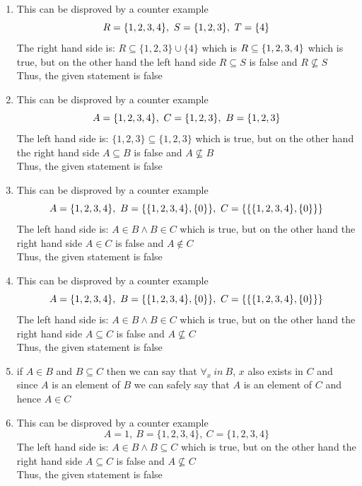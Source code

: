 \documentclass[12pt]{article}
\newenvironment{solution}[2][Solution]{ \begin{trivlist}
\item[\hskip \labelsep {\bfseries #1}]}{\end{trivlist}}
\begin{document}
\begin{solution}{1}
\item[] 
\begin{enumerate}[label=\alph*)]
\item This can be disproved by a counter example $$R = \{1,2,3,4\},\ S = \{1,2,3\},\ T = \{4\} \\$$
The right hand side is:
$R \subseteq \{1,2,3\} \cup \{4\}$ which is $R \subseteq \{1,2,3,4\} \\$ which is true, but on the other hand the left hand side $R \subseteq S$ is false and $R \nsubseteq S$ \\
Thus, the given statement is false

\item This can be disproved by a counter example $$A = \{1,2,3,4\},\ C = \{1,2,3\},\ B = \{1,2,3\} \\$$
The left hand side is:
$\{1,2,3\} \subseteq \{1,2,3\}$ which is true, but on the other hand the right hand side $A \subseteq B$ is false and $A \nsubseteq B$ \\
Thus, the given statement is false

\item This can be disproved by a counter example $$A = \{1,2,3,4\},\ B = \{\{1,2,3,4\},\{0\}\},\ C = \{\{\{1,2,3,4\},\{0\}\}\} \\$$
The left hand side is:
$A \in B \wedge B \in C$ which is true, but on the other hand the right hand side $A \in C$ is false and $A \notin C$ \\
Thus, the given statement is false

\item This can be disproved by a counter example $$A = \{1,2,3,4\},\ B = \{\{1,2,3,4\},\{0\}\},\ C = \{\{\{1,2,3,4\},\{0\}\}\} \\$$
The left hand side is:
$A \in B \wedge B \in C$ which is true, but on the other hand the right hand side $A \subseteq C$ is false and $A \nsubseteq C$ \\
Thus, the given statement is false

\item if $A \in B$ and $B \subseteq C$ then we can say that $\forall_x\ in\ B$, $x$ also exists in $C$ and since $A$ is an element of $B$ we can safely say that $A$ is an element of $C$ and hence $A \in C$

\item This can be disproved by a counter example $$A = 1,\ B = \{1,2,3,4\},\ C = \{1,2,3,4\}$$
The left hand side is:
$A \in B \wedge B \subseteq C$ which is true, but on the other hand the right hand side $A \subseteq C$ is false and $A \nsubseteq C$ \\
Thus, the given statement is false
\end{enumerate}
\end{solution}
\end{document}

